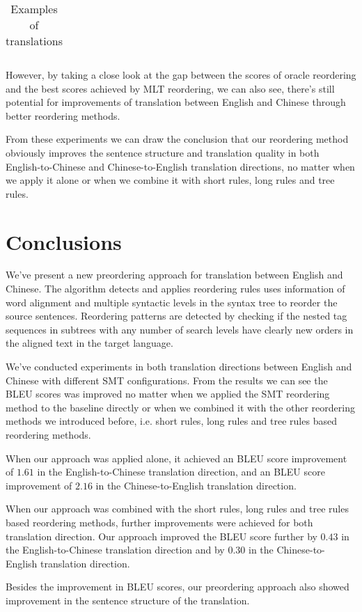 \documentclass[a4paper]{article}
\begin{document}
\begin{table*}
\begin{tabular}{|l|m{}|}
\end{tabular}
\caption{Examples of translations}
\label{te}
\end{table*}

However, by taking a close look at the gap between the scores of oracle reordering and the best scores achieved by MLT reordering, we can also see, there's still potential for improvements of translation between English and Chinese through better reordering methods.

From these experiments we can draw the conclusion that our reordering method obviously improves the sentence structure and  translation quality in both English-to-Chinese and Chinese-to-English translation directions, no matter when we apply it alone or when we combine it with short rules, long rules and tree rules. 

\section{Conclusions}

We've present a new preordering approach for translation between English and Chinese. The algorithm detects and applies reordering rules uses information of word alignment and multiple syntactic levels in the syntax tree to reorder the source sentences. Reordering patterns are detected by checking if the nested tag sequences in subtrees with any number of search levels have clearly new orders in the aligned text in the target language.

We've conducted experiments in both translation directions between English and Chinese with different SMT configurations. From the results we can see the BLEU scores was improved no matter when we applied the SMT reordering method to the baseline directly or when we combined it with the other reordering methods we introduced before, i.e. short rules, long rules and tree rules based reordering methods.

When our approach was applied alone, it achieved an BLEU score improvement of $1.61$ in the English-to-Chinese translation direction, and an BLEU score improvement of $2.16$ in the Chinese-to-English translation direction.

When our approach was combined with the short rules, long rules and tree rules based reordering methods, further improvements were achieved for both translation direction. Our approach improved the BLEU score further by $0.43$ in the English-to-Chinese translation direction and by $0.30$ in the Chinese-to-English translation direction.

Besides the improvement in BLEU scores, our preordering approach also showed improvement in the sentence structure of the translation.



\end{document}
